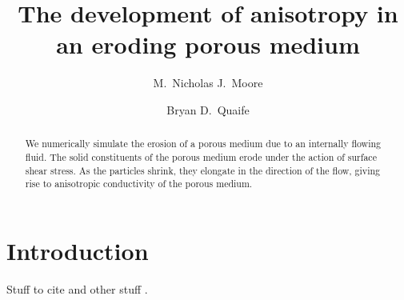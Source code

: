 \documentclass[3p]{elsarticle}
\begin{document}
\title{The development of anisotropy in an eroding porous medium}
%
\author[Nick]{M.~Nicholas J.~Moore}
\author[Bryan]{Bryan D.~Quaife}
\address[Nick]{Department of Mathematics and Geophysical Fluid Dynamics Institute, Florida State University, Tallahassee, FL, 32306.}
\address[Bryan]{Department of Scientific Computing and Geophysical Fluid Dynamics Institute, Florida State University, Tallahassee, FL, 32306.}
\begin{abstract}
We numerically simulate the erosion of a porous medium due to an internally flowing fluid. The solid constituents of the porous medium erode under the action of surface shear stress. As the particles shrink, they elongate in the direction of the flow, giving rise to anisotropic conductivity of the porous medium.
\end{abstract}
\maketitle

\section{Introduction}
Stuff to cite \cite{Ristroph2012, Moore2013, Huang2015, MooreCPAM2017} and other stuff \cite{Rycroft2016, Mitchell2016}.
\end{document}
